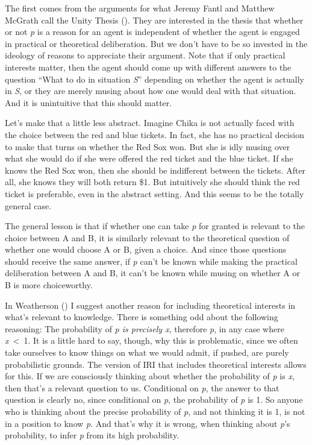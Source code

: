 \documentclass[
  11pt,
  letterpaper,
  DIV=11,
  numbers=noendperiod,
  twoside]{scrartcl}
\begin{document}
The first comes from the arguments for what Jeremy Fantl and Matthew
McGrath call the Unity Thesis (). They are interested in the thesis that whether
or not \emph{p} is a reason for an agent is independent of whether the
agent is engaged in practical or theoretical deliberation. But we don't
have to be so invested in the ideology of reasons to appreciate their
argument. Note that if only practical interests matter, then the agent
should come up with different answers to the question ``What to do in
situation \emph{S}'' depending on whether the agent is actually in
\emph{S}, or they are merely musing about how one would deal with that
situation. And it is unintuitive that this should matter.

Let's make that a little less abstract. Imagine Chika is not actually
faced with the choice between the red and blue tickets. In fact, she has
no practical decision to make that turns on whether the Red Sox won. But
she is idly musing over what she would do if she were offered the red
ticket and the blue ticket. If she knows the Red Sox won, then she
should be indifferent between the tickets. After all, she knows they
will both return \$1. But intuitively she should think the red ticket is
preferable, even in the abstract setting. And this seems to be the
totally general case.

The general lesson is that if whether one can take \emph{p} for granted
is relevant to the choice between A and B, it is similarly relevant to
the theoretical question of whether one would choose A or B, given a
choice. And since those questions should receive the same answer, if
\emph{p} can't be known while making the practical deliberation between
A and B, it can't be known while musing on whether A or B is more
choiceworthy.

In Weatherson () I suggest another
reason for including theoretical interests in what's relevant to
knowledge. There is something odd about the following reasoning: The
probability of \emph{p is precisely x}, therefore \emph{p}, in any case
where \emph{x}~\textless~1. It is a little hard to say, though, why this
is problematic, since we often take ourselves to know things on what we
would admit, if pushed, are purely probabilistic grounds. The version of
IRI that includes theoretical interests allows for this. If we are
consciously thinking about whether the probability of \emph{p} is
\emph{x}, then that's a relevant question to us. Conditional on
\emph{p}, the answer to that question is clearly no, since conditional
on \emph{p}, the probability of \emph{p} is 1. So anyone who is thinking
about the precise probability of \emph{p}, and not thinking it is 1, is
not in a position to know \emph{p}. And that's why it is wrong, when
thinking about \emph{p}'s probability, to infer \emph{p} from its high
probability.
\end{document}
